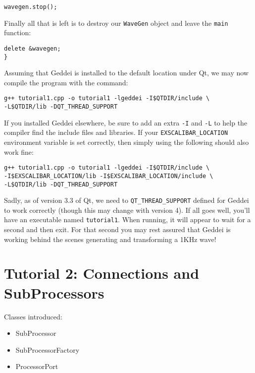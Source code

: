 \begin{verbatim}
wavegen.stop();
\end{verbatim}

Finally all that is left is to destroy our \texttt{WaveGen} object and leave the \texttt{main} function:

\begin{verbatim}
delete &wavegen;
}
\end{verbatim}

Assuming that Geddei is installed to the default location under Qt, we may now compile the program with the command:

\begin{verbatim}
g++ tutorial1.cpp -o tutorial1 -lgeddei -I$QTDIR/include \
-L$QTDIR/lib -DQT_THREAD_SUPPORT
\end{verbatim}

If you installed Geddei elsewhere, be sure to add an extra \texttt{-I} and \texttt{-L} to help the compiler find the include files and libraries. If your \texttt{EXSCALIBAR\_LOCATION} environment variable is set correctly, then simply using the following should also work fine:

\begin{verbatim}
g++ tutorial1.cpp -o tutorial1 -lgeddei -I$QTDIR/include \
-I$EXSCALIBAR_LOCATION/lib -I$EXSCALIBAR_LOCATION/include \
-L$QTDIR/lib -DQT_THREAD_SUPPORT
\end{verbatim}

Sadly, as of version 3.3 of Qt, we need to \texttt{QT\_THREAD\_SUPPORT} defined for Geddei to work correctly (though this may change with version 4). If all goes well, you'll have an executable named \texttt{tutorial1}. When running, it will appear to wait for a second and then exit. For that second you may rest assured that Geddei is working behind the scenes generating and transforming a 1KHz wave!




\section{Tutorial 2: Connections and SubProcessors}

Classes introduced:
\begin{itemize}
\item SubProcessor
\item SubProcessorFactory
\item ProcessorPort
\end{itemize}

